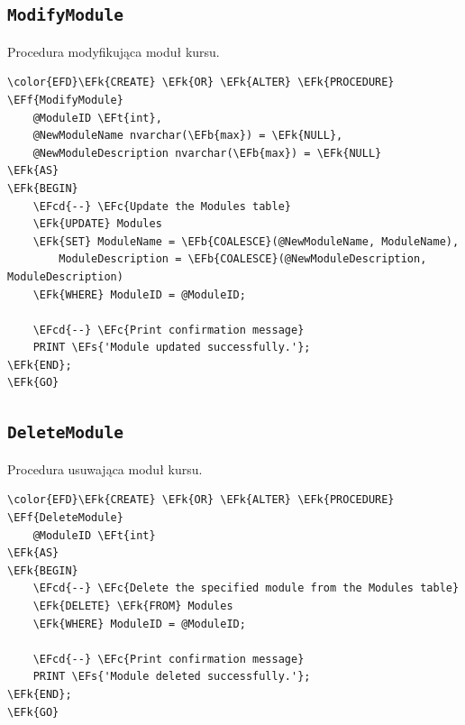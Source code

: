 \documentclass[11pt]{article}
\newcommand{\EFc}[1]{\textcolor{EFc}{\textit{#1}}} %
\newcommand{\EFcd}[1]{\textcolor{EFcd}{\textit{#1}}} %
\newcommand{\EFs}[1]{\textcolor{EFs}{#1}} %
\newcommand{\EFk}[1]{\textcolor{EFk}{\textbf{#1}}} %
\newcommand{\EFb}[1]{\textcolor{EFb}{\textbf{#1}}} %
\newcommand{\EFf}[1]{\textcolor{EFf}{#1}} %
\newcommand{\EFt}[1]{\textcolor{EFt}{\textbf{#1}}} %
\begin{document}
\subsection{\texttt{ModifyModule}}
\label{sec:orgb40954a}
Procedura modyfikująca moduł kursu.
\begin{Code}
\begin{Verbatim}
\color{EFD}\EFk{CREATE} \EFk{OR} \EFk{ALTER} \EFk{PROCEDURE} \EFf{ModifyModule}
    @ModuleID \EFt{int},
    @NewModuleName nvarchar(\EFb{max}) = \EFk{NULL},
    @NewModuleDescription nvarchar(\EFb{max}) = \EFk{NULL}
\EFk{AS}
\EFk{BEGIN}
    \EFcd{--} \EFc{Update the Modules table}
    \EFk{UPDATE} Modules
    \EFk{SET} ModuleName = \EFb{COALESCE}(@NewModuleName, ModuleName),
        ModuleDescription = \EFb{COALESCE}(@NewModuleDescription, ModuleDescription)
    \EFk{WHERE} ModuleID = @ModuleID;

    \EFcd{--} \EFc{Print confirmation message}
    PRINT \EFs{'Module updated successfully.'};
\EFk{END};
\EFk{GO}
\end{Verbatim}
\end{Code}
\subsection{\texttt{DeleteModule}}
\label{sec:org8a131d9}
Procedura usuwająca moduł kursu.
\begin{Code}
\begin{Verbatim}
\color{EFD}\EFk{CREATE} \EFk{OR} \EFk{ALTER} \EFk{PROCEDURE} \EFf{DeleteModule}
    @ModuleID \EFt{int}
\EFk{AS}
\EFk{BEGIN}
    \EFcd{--} \EFc{Delete the specified module from the Modules table}
    \EFk{DELETE} \EFk{FROM} Modules
    \EFk{WHERE} ModuleID = @ModuleID;

    \EFcd{--} \EFc{Print confirmation message}
    PRINT \EFs{'Module deleted successfully.'};
\EFk{END};
\EFk{GO}
\end{Verbatim}
\end{Code}
\end{document}
